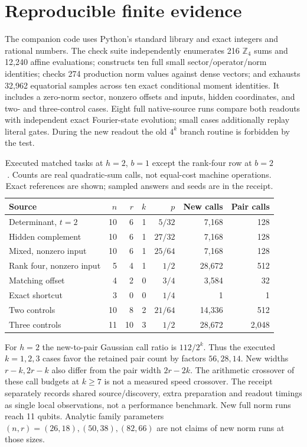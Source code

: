 \documentclass[11pt]{article}
\begin{document}
\section{Reproducible finite evidence}\label{sec:evidence}
The companion code uses Python's standard library and exact integers and rational
numbers. The check suite independently enumerates 216 $\mathbb Z_4$ sums and 12,240
affine evaluations; constructs ten full small sector/operator/norm identities;
checks 274 production norm values against dense vectors; and exhausts 32,962
equatorial samples across ten exact conditional moment identities. It includes a
zero-norm sector, nonzero offsets and inputs, hidden coordinates, and two- and
three-control cases. Eight full native-source runs compare both readouts with
independent exact Fourier-state evolution; small cases additionally replay literal
gates. During the new readout the old $4^k$ branch routine is forbidden by the test.

\begin{table}[ht]
\centering\small
\begin{tabular}{lrrrrrr}
\toprule
Source & $n$ & $r$ & $k$ & $p$ & New calls & Pair calls\\\midrule
Determinant, $t=2$ &10&6&1&$5/32$&7,168&128\\
Hidden complement &10&6&1&$27/32$&7,168&128\\
Mixed, nonzero input &10&6&1&$25/64$&7,168&128\\
Rank four, nonzero input &5&4&1&$1/2$&28,672&512\\
Matching offset &4&2&0&$3/4$&3,584&32\\
Exact shortcut &3&0&0&$1/4$&1&1\\
Two controls &10&8&2&$21/64$&14,336&512\\
Three controls &11&10&3&$1/2$&28,672&2,048\\
\bottomrule
\end{tabular}
\caption{Executed matched tasks at $h=2$, $b=1$ except the rank-four row at $b=2$.
Counts are real quadratic-sum calls, not equal-cost machine operations. Exact
references are shown; sampled answers and seeds are in the receipt.}
\label{tab:runs}
\end{table}

For $h=2$ the new-to-pair Gaussian call ratio is $112/2^k$. Thus the executed
$k=1,2,3$ cases favor the retained pair count by factors $56,28,14$. New widths
$r-k,2r-k$ also differ from the pair width $2r-2k$. The arithmetic crossover of
these call budgets at $k\geq7$ is not a measured speed crossover. The receipt
separately records shared source/discovery, extra preparation and readout timings
as single local observations, not a performance benchmark. New full norm runs reach
11 qubits. Analytic family parameters $(n,r)=(26,18),(50,38),(82,66)$ are not claims
of new norm runs at those sizes.
\end{document}
